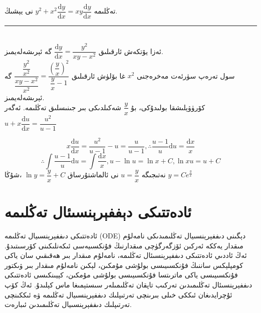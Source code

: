 \begin{myexample}
	تەڭلىمە
$y^2+x^2\dfrac{\textrm{d}y}{\textrm{d}x}=xy\dfrac{\textrm{d}y}{\textrm{d}x}$
	نى يېشىڭ.
	\\\rule{\linewidth}{0.05em}\\
	ئەزا يۆتكەش ئارقىلىق
	$\dfrac{\textrm{d}y}{\textrm{d}x}=\dfrac{y^2}{xy-x^2}$
	گە ئېرىشەلەيمىز.\\سول تەرەپ سۈرئەت مەخرەجنى 
	$x^2$
	غا بۆلۈش ئارقىلىق
	$\dfrac{\dfrac{y^2}{x^2}}{\dfrac{xy-x^2}{x^2}}=\dfrac{\left(\dfrac{y}{x}\right)^2}{\dfrac{y}{x}-1}$
	گە ئېرىشەلەيمىز.\\كۆرۈۋېلىشقا بولىدۇكى، بۇ $\dfrac{y}{x}$ شەكىلدىكى بىر جىنىسلىق تەڭلىمە. ئەگەر
	$u+x\dfrac{\textrm{d}u}{\textrm{d}x}=\dfrac{u^2}{u-1}$

	$$x\dfrac{\textrm{d}u}{\textrm{d}x}=\dfrac{u^2}{u-1}-u=\dfrac{u}{u-1},
	\therefore\dfrac{u-1}{u}\textrm{d}u=\dfrac{\textrm{d}x}{x}$$
	$$
	\therefore\displaystyle{\int\dfrac{u-1}{u}\textrm{d}u=\int\dfrac{\textrm{d}x}{x}}, u-\ln u=\ln x+C, \ln xu=u+C$$
	نەتىجىگە 
	$u=\dfrac{y}{x}$
	نى ئالماشتۇرساق
	$\ln y=\dfrac{y}{x}+C$
	،شۇڭا
	$y=Ce^{\frac{y}{x}}$
\end{myexample}

\section{ئادەتتىكى دېففېرېنسىئال تەڭلىمە}
ئادەتتىكى دىففېرېنسىيال تەڭلىمە (ODE) دېگىنى دىففېرېنسىيال تەڭلىمىدىكى نامەلۇم مىقدار يەككە ئەركىن ئۆزگەرگۈچى مىقدارنىڭ فۇنكسىيەسى ئىكەنلىكىنى كۆرسىتىدۇ. ئەڭ ئاددىي ئادەتتىكى دىففېرېنسىئال تەڭلىمە، نامەلۇم مىقدار بىر ھەقىقىي سان ياكى كومپلېكس ساننىڭ فۇنكسىيىسى بولۇشى مۇمكىن، لېكىن نامەلۇم مىقدار بىر ۋىكتور فۇنكسىيىسى ياكى ماترىتسا فۇنكسىيىسى بولۇشى مۇمكىن، كېيىنكىسى ئادەتتىكى دىففېرېنسىئال تەڭلىمىدىن تەركىب تاپقان تەڭلىمىلەر سىستېمىغا ماس كېلىدۇ. ئەڭ كۆپ ئۇچرايدىغان ئىككى خىلى بىرىنچى تەرتىپلىك دىففېرېنسىيال تەڭلىمە ۋە ئىككىنچى تەرتىپلىك دىففېرېنسىيال تەڭلىمىدىن ئىبارەت.
 
